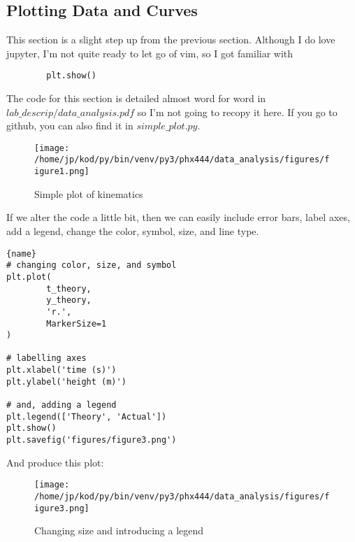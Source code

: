 \documentclass{article}
\begin{document}
\subsection{Plotting Data and Curves}
This section is a slight step up from the previous section. Although I do love
jupyter, I'm not quite ready to let go of vim, so I got familiar with 

\begin{lstlisting}
        plt.show()
\end{lstlisting}

The code for this section is detailed almost word for word in
$lab\_descrip/data\_analysis.pdf$ so I'm not going to recopy it here. If you go
to github, you can also find it in $simple\_plot.py$. 
\begin{figure}[H]
        \begin{center}
        \texttt{[image: /home/jp/kod/py/bin/venv/py3/phx444/data\_analysis/figures/figure1.png]}
        \caption{Simple plot of kinematics}
        \label{fig:fig_1}
        \end{center}
\end{figure}

If we alter the code a little bit, then we can easily include error bars, label axes, add a legend, change the
color, symbol, size, and line type. 
\begin{center}
\begin{minipage}[t]{.70\linewidth}
\begin{lstlisting}[caption=Altering the Graphs, frame=tlrb]{name}
# changing color, size, and symbol
plt.plot(
        t_theory,
        y_theory,
        'r.',
        MarkerSize=1
)

# labelling axes
plt.xlabel('time (s)')
plt.ylabel('height (m)')

# and, adding a legend
plt.legend(['Theory', 'Actual'])
plt.show()
plt.savefig('figures/figure3.png')

\end{lstlisting}
\end{minipage}
\end{center}


And produce this plot:
\begin{figure}[H]
        \begin{center}
        \texttt{[image: /home/jp/kod/py/bin/venv/py3/phx444/data\_analysis/figures/figure3.png]}
        \caption{Changing size and introducing a legend}
        \label{fig:fig_3}
        \end{center}
\end{figure}
\end{document}

